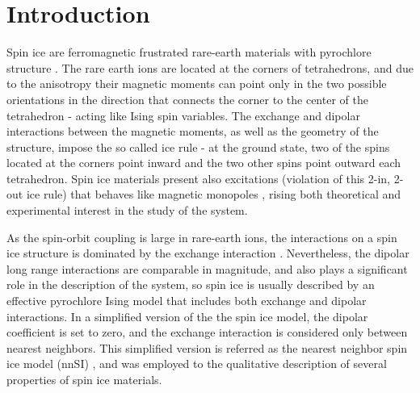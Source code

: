 \documentclass[aps,showkeys,groupedaddress]{revtex4}
\begin{document}

\maketitle

\section{Introduction}

Spin ice are ferromagnetic frustrated rare-earth materials with pyrochlore structure \cite{Harris1997,Ramirez1999,Bramwell2001b,Ramirez2002}. The rare earth ions are located at the corners of tetrahedrons, and due to the anisotropy their magnetic moments can point only in the two possible orientations in the direction that connects the corner to the center of the tetrahedron - acting like Ising spin variables. The exchange and dipolar interactions between the magnetic moments, as well as the geometry of the structure, impose the so called ice rule - at the ground state, two of the spins located at the corners point inward and the two other spins point outward each tetrahedron. Spin ice materials present also excitations (violation of this 2-in, 2-out ice rule) that behaves like magnetic monopoles \cite{Castelnovo2008,Morris2009}, rising both theoretical \cite{Snyder2001,Melko2004,Isakov2005,Jaubert2009,Udagawa2015} and experimental \cite{Bramwell2001,Fukazawa2002,Mirebeau2005,Kadowaki2009,Bramwell2009,Giblin2011} interest in the study of the system.

As the spin-orbit coupling is large in rare-earth ions, the interactions on a spin ice structure is dominated by the exchange interaction \cite{Hertog2000,Bramwell2001}. Nevertheless, the dipolar long range interactions are comparable in magnitude, and also plays a significant role in the description of the system, so spin ice is usually described by an effective pyrochlore Ising model \cite{Bramwell2004} that includes both exchange and dipolar interactions. In a simplified version of the the spin ice model, the dipolar coefficient is set to zero, and the exchange interaction is considered only between nearest neighbors. This simplified version is referred as the nearest neighbor spin ice model (nnSI) \cite{Hertog2000,Bramwell2001,Isakov2005,Guruciaga2014,Ferreyra2016}, and was employed to the qualitative description of several properties of spin ice materials.
\end{document}
